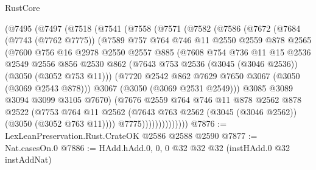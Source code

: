 \begin{lexlean}{RustCore}
\begin{coremodule}
        (@7495
          (@7497
            (@7518
              (@7541
                (@7558
                  (@7571
                    (@7582
                      (@7586
                        (@7672
                          (@7684
                            (@7743 (@7762 @7775))
                            (@7589
                              @757
                              @764
                              @746
                              @11
                              @2550
                              @2559
                              @878
                              @2565
                              (@7600
                                @756
                                @16
                                @2978
                                @2550
                                @2557
                                @885
                                (@7608
                                  @754
                                  @736
                                  @11
                                  @15
                                  @2536
                                  @2549
                                  @2556
                                  @856
                                  @2530
                                  @862
                                  (@7643 @753 @2536 (@3045 (@3046 @2536)) (@3050 (@3052 @753 @11)))
                                  (@7720 @2542 @862 @7629 @7650 @3067 (@3050 (@3069 @2543 @878)))
                                  @3067
                                  (@3050 (@3069 @2531 @2549)))
                                @3085
                                @3089
                                @3094
                                @3099
                                @3105
                                @7670)
                              (@7676
                                @2559
                                @764
                                @746
                                @11
                                @878
                                @2562
                                @878
                                @2522
                                (@7753
                                  @764
                                  @11
                                  @2562
                                  (@7643 @763 @2562 (@3045 (@3046 @2562)) (@3050 (@3052 @763 @11))))
                                @7775))))))))))))))
@7876 := LexLeanPreservation.Rust.CrateOK @2586 @2588 @2590
@7877 := Nat.casesOn.{0}
@7886 := HAdd.hAdd.{0, 0, 0} @32 @32 @32 (instHAdd.{0} @32 instAddNat)

\end{coremodule}
\end{lexlean}
